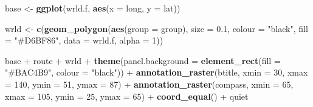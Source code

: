 \documentclass[]{article}
\newenvironment{Shaded}{}{}
\newcommand{\KeywordTok}[1]{\textcolor[rgb]{0.00,0.44,0.13}{\textbf{{#1}}}}
\newcommand{\DataTypeTok}[1]{\textcolor[rgb]{0.56,0.13,0.00}{{#1}}}
\newcommand{\DecValTok}[1]{\textcolor[rgb]{0.25,0.63,0.44}{{#1}}}
\newcommand{\FloatTok}[1]{\textcolor[rgb]{0.25,0.63,0.44}{{#1}}}
\newcommand{\StringTok}[1]{\textcolor[rgb]{0.25,0.44,0.63}{{#1}}}
\newcommand{\NormalTok}[1]{{#1}}
\begin{document}
\begin{Shaded}
\begin{Highlighting}[]
\NormalTok{base <- }\KeywordTok{ggplot}\NormalTok{(wrld.f, }\KeywordTok{aes}\NormalTok{(}\DataTypeTok{x =} \NormalTok{long, }\DataTypeTok{y =} \NormalTok{lat))}
\end{Highlighting}
\end{Shaded}
\begin{Shaded}
\end{Shaded}
\begin{Shaded}
\begin{Highlighting}[]
\NormalTok{wrld <- }\KeywordTok{c}\NormalTok{(}\KeywordTok{geom_polygon}\NormalTok{(}\KeywordTok{aes}\NormalTok{(}\DataTypeTok{group =} \NormalTok{group), }\DataTypeTok{size =} \FloatTok{0.1}\NormalTok{, }\DataTypeTok{colour =} \StringTok{"black"}\NormalTok{, }\DataTypeTok{fill =} \StringTok{"#D6BF86"}\NormalTok{, }
    \DataTypeTok{data =} \NormalTok{wrld.f, }\DataTypeTok{alpha =} \DecValTok{1}\NormalTok{))}
\end{Highlighting}
\end{Shaded}
\begin{Shaded}
\begin{Highlighting}[]
\NormalTok{base + route + wrld + }\KeywordTok{theme}\NormalTok{(}\DataTypeTok{panel.background =} \KeywordTok{element_rect}\NormalTok{(}\DataTypeTok{fill =} \StringTok{"#BAC4B9"}\NormalTok{, }
    \DataTypeTok{colour =} \StringTok{"black"}\NormalTok{)) + }\KeywordTok{annotation_raster}\NormalTok{(btitle, }\DataTypeTok{xmin =} \DecValTok{30}\NormalTok{, }\DataTypeTok{xmax =} \DecValTok{140}\NormalTok{, }\DataTypeTok{ymin =} \DecValTok{51}\NormalTok{, }
    \DataTypeTok{ymax =} \DecValTok{87}\NormalTok{) + }\KeywordTok{annotation_raster}\NormalTok{(compass, }\DataTypeTok{xmin =} \DecValTok{65}\NormalTok{, }\DataTypeTok{xmax =} \DecValTok{105}\NormalTok{, }\DataTypeTok{ymin =} \DecValTok{25}\NormalTok{, }
    \DataTypeTok{ymax =} \DecValTok{65}\NormalTok{) + }\KeywordTok{coord_equal}\NormalTok{() + quiet}
\end{Highlighting}
\end{Shaded}
\end{document}
